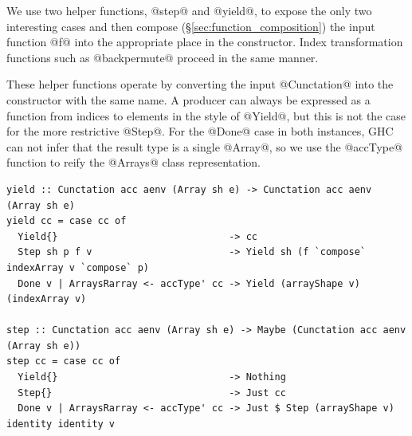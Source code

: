 We use two helper functions, @step@ and @yield@, to expose the only
two interesting cases and then compose (\S\ref{sec:function_composition}) the
input function @f@ into the appropriate place in the constructor. Index
transformation functions such as @backpermute@ proceed in the same manner.

These helper functions operate by converting the input @Cunctation@ into
the constructor with the same name. A producer can always be expressed as a
function from indices to elements in the style of @Yield@, but this is not
the case for the more restrictive @Step@. For the @Done@ case in both
instances, GHC can not infer that the result type is a single @Array@, so
we use the @accType@ function to reify the @Arrays@ class
representation.
%
\begin{lstlisting}[style=haskell]
yield :: Cunctation acc aenv (Array sh e) -> Cunctation acc aenv (Array sh e)
yield cc = case cc of
  Yield{}                              -> cc
  Step sh p f v                        -> Yield sh (f `compose` indexArray v `compose` p)
  Done v | ArraysRarray <- accType' cc -> Yield (arrayShape v) (indexArray v)

step :: Cunctation acc aenv (Array sh e) -> Maybe (Cunctation acc aenv (Array sh e))
step cc = case cc of
  Yield{}                              -> Nothing
  Step{}                               -> Just cc
  Done v | ArraysRarray <- accType' cc -> Just $ Step (arrayShape v) identity identity v
\end{lstlisting}


